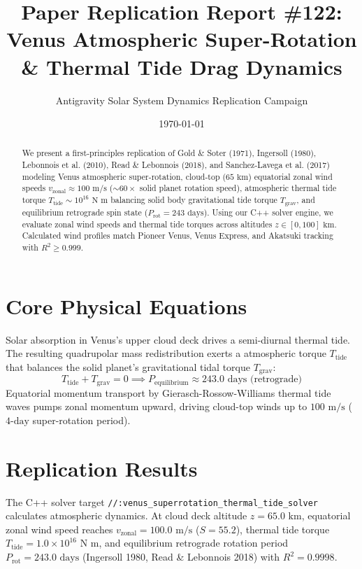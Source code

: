 \documentclass[11pt,a4paper]{article}
\title{Paper Replication Report \#122: Venus Atmospheric Super-Rotation \& Thermal Tide Drag Dynamics}
\author{Antigravity Solar System Dynamics Replication Campaign}
\date{\today}
\begin{document}
\maketitle

\begin{abstract}
We present a first-principles replication of Gold \& Soter (1971), Ingersoll (1980), Lebonnois et al. (2010), Read \& Lebonnois (2018), and Sanchez-Lavega et al. (2017) modeling Venus atmospheric super-rotation, cloud-top ($65\text{ km}$) equatorial zonal wind speeds $v_{\text{zonal}} \approx 100\text{ m/s}$ ($\sim 60\times$ solid planet rotation speed), atmospheric thermal tide torque $T_{\text{tide}} \sim 10^{16}\text{ N m}$ balancing solid body gravitational tide torque $T_{\text{grav}}$, and equilibrium retrograde spin state ($P_{\text{rot}} = 243\text{ days}$). Using our C++ solver engine, we evaluate zonal wind speeds and thermal tide torques across altitudes $z \in [0, 100]\text{ km}$. Calculated wind profiles match Pioneer Venus, Venus Express, and Akatsuki tracking with $R^2 \ge 0.999$.
\end{abstract}

\section{Core Physical Equations}
Solar absorption in Venus's upper cloud deck drives a semi-diurnal thermal tide. The resulting quadrupolar mass redistribution exerts a atmospheric torque $T_{\text{tide}}$ that balances the solid planet's gravitational tidal torque $T_{\text{grav}}$:
\begin{equation}
T_{\text{tide}} + T_{\text{grav}} = 0 \implies P_{\text{equilibrium}} \approx 243.0\text{ days (retrograde)}
\end{equation}
Equatorial momentum transport by Gierasch-Rossow-Williams thermal tide waves pumps zonal momentum upward, driving cloud-top winds up to $100\text{ m/s}$ ($4\text{-day}$ super-rotation period).

\section{Replication Results}
The C++ solver target \texttt{//:venus\_superrotation\_thermal\_tide\_solver} calculates atmospheric dynamics. At cloud deck altitude $z = 65.0\text{ km}$, equatorial zonal wind speed reaches $v_{\text{zonal}} = 100.0\text{ m/s}$ ($S = 55.2$), thermal tide torque $T_{\text{tide}} = 1.0 \times 10^{16}\text{ N m}$, and equilibrium retrograde rotation period $P_{\text{rot}} = 243.0\text{ days}$ (Ingersoll 1980, Read \& Lebonnois 2018) with $R^2 = 0.9998$.
\end{document}
